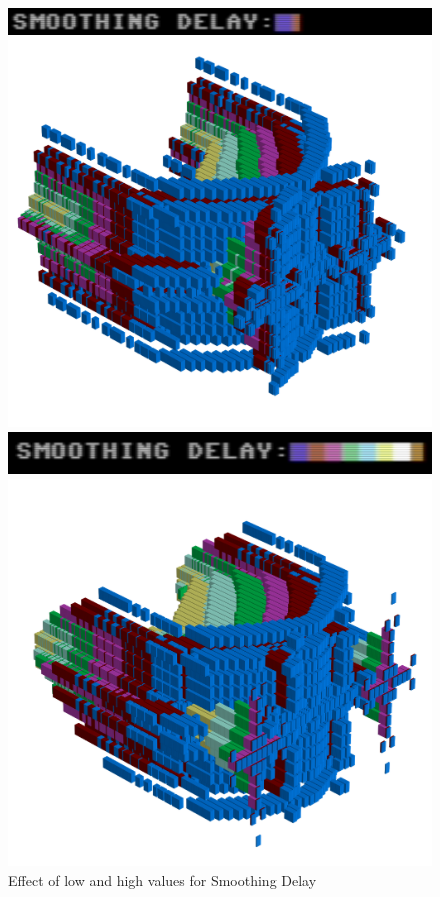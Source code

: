 \begin{figure}[H]
    \centering
    \begin{adjustbox}{width=3cm,margin=11cm -12cm}
      \includegraphics[width=12cm]{src/delay/delay-low.png}%
    \end{adjustbox}
    \begin{adjustbox}{width=10.5cm,center}
      \includegraphics[width=12cm]{src/delay/pattern0-45.png}%
    \end{adjustbox}
    \begin{adjustbox}{width=3cm,margin=11cm -12cm}
      \includegraphics[width=12cm]{src/delay/delay-high.png}%
    \end{adjustbox}
    \begin{adjustbox}{width=10.5cm,margin=0cm -2cm}
      \includegraphics[width=12cm]{src/delay/pattern1-45.png}%
    \end{adjustbox}
    \caption{Effect of low and high values for Smoothing Delay}
\end{figure}
